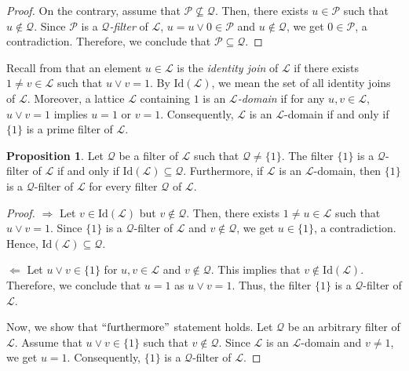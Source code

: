 \documentclass[preprint,review,10pt]{amsart}
\theoremstyle{definition}
\newtheorem{proposition}[theorem]{Proposition}
\theoremstyle{remark}
\numberwithin{equation}{section}
\begin{document}
\begin{proof}
On the contrary, assume that $\mathcal{P} \nsubseteq  \mathcal{Q}$. Then, there exists $u \in \mathcal{P}$ such that  $u \notin  \mathcal{Q}$. Since $\mathcal{P}$ is a {\it $\mathcal{Q}$-filter} of $\mathcal{L}$, $u =u \vee 0 \in \mathcal{P}$ and $u \notin  \mathcal{Q}$, we get $0 \in \mathcal{P}$, a contradiction. Therefore, we conclude that $\mathcal{P} \subseteq  \mathcal{Q}$. 
\end{proof}
Recall from \cite{Atani2} that an element $u \in \mathcal{L}$ is  the {\it identity join} of $\mathcal{L}$ if there exists $1 \neq v \in \mathcal{L}$ such that $u \vee v =1$. By $\text{Id}(\mathcal{L})$, we mean the set of all identity joins of $\mathcal{L}$. Moreover, 
a lattice $\mathcal{L}$ containing  $1$ is  an {\it $\mathcal{L}$-domain} if for any $u, v \in \mathcal{L}$, $ u \vee v = 1$ implies $u = 1$ or $ v = 1$.
 Consequently, $\mathcal{L}$ is an $\mathcal{L}$-domain if and only if $\{1\}$ is a prime filter of $\mathcal{L}$.
 \begin{proposition} \label{1}
 Let $\mathcal{Q}$ be a filter of $\mathcal{L}$ such that $\mathcal{Q} \neq \{1\}$. The filter $\{1\}$ is a $\mathcal{Q}$-filter of $\mathcal{L}$ if and only if $\text{Id}(\mathcal{L}) \subseteq \mathcal{Q}$. Furthermore,  if $\mathcal{L}$ is an $\mathcal{L}$-domain, then  $\{1\}$ is a $\mathcal{Q}$-filter of $\mathcal{L}$ for every filter $\mathcal{Q}$ of $\mathcal{L}$.
 \end{proposition}
 \begin{proof}
$\Longrightarrow$ Let   $v \in \text{Id}(\mathcal{L})$ but $v \notin  \mathcal{Q}$. Then, there exists $1 \neq u \in \mathcal{L}$ such that $u \vee v =1$. Since  $\{1\}$ is a $\mathcal{Q}$-filter of $\mathcal{L}$ and $v \notin \mathcal{Q}$, we get $u \in \{1\}$, a contradiction. Hence, $\text{Id}(\mathcal{L}) \subseteq \mathcal{Q}$.

$\Longleftarrow$ Let $u \vee v \in \{1\}$ for $u,v \in \mathcal{L}$ and $v \notin \mathcal{Q}$. This implies that $v \notin \text{Id}(\mathcal{L})$. Therefore, we conclude that $u=1$ as $u \vee v =1$. Thus, the filter $\{1\}$ is a $\mathcal{Q}$-filter of $\mathcal{L}$.
 

Now, we show that $``\text{furthermore}"$ statement holds. Let $\mathcal{Q}$ be an arbitrary filter of $\mathcal{L}$. Assume that $u \vee v \in \{1\}$ such that $ v \notin \mathcal{Q}$. Since $\mathcal{L}$ is an $\mathcal{L}$-domain  and $v \neq 1$, we get $u=1$. Consequently, $\{1\}$ is a $\mathcal{Q}$-filter of $\mathcal{L}$.
 \end{proof}
 
\end{document}
